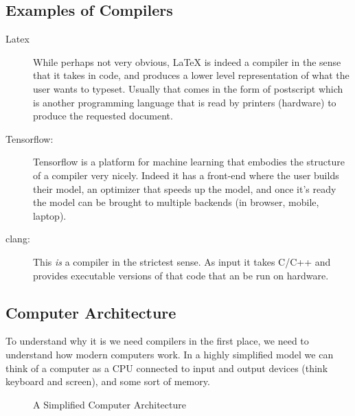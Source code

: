 \subsection{Examples of Compilers}
\begin{description}
    \item[Latex] While perhaps not very obvious, \LaTeX{} is indeed a compiler in the sense that it takes in code, and produces a lower level representation of what the user wants to typeset. Usually that comes in the form of postscript which is another programming language that is read by printers (hardware) to produce the requested document.
    \item[Tensorflow:] Tensorflow is a platform for machine learning that embodies the structure of a compiler very nicely. Indeed it has a front-end where the user builds their model, an optimizer that speeds up the model, and once it's ready the model can be brought to multiple backends (in browser, mobile, laptop).
    \item[clang:] This \emph{is} a compiler in the strictest sense. As input it takes C/C++ and provides executable versions of that code that an be run on hardware.
\end{description}

\subsection{Computer Architecture}
To understand why it is we need compilers in the first place, we need to understand how modern computers work.
In a highly simplified model we can think of a computer as a \ac{CPU} connected to input and output devices (think keyboard and screen), and some sort of memory.
\begin{figure}[h]
    \centering
    \caption{A Simplified Computer Architecture}
    \label{fig:comparch}
\end{figure}


